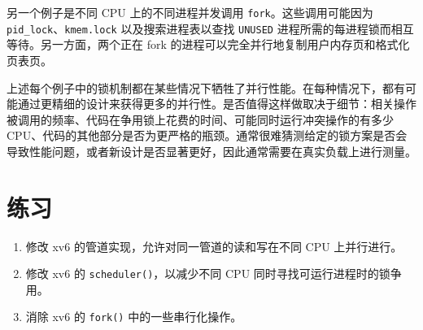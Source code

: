 另一个例子是不同 CPU 上的不同进程并发调用 {\tt fork}。这些调用可能因为 {\tt pid\_lock}、{\tt kmem.lock} 以及搜索进程表以查找 {\tt UNUSED} 进程所需的每进程锁而相互等待。另一方面，两个正在 fork 的进程可以完全并行地复制用户内存页和格式化页表页。

上述每个例子中的锁机制都在某些情况下牺牲了并行性能。在每种情况下，都有可能通过更精细的设计来获得更多的并行性。是否值得这样做取决于细节：相关操作被调用的频率、代码在争用锁上花费的时间、可能同时运行冲突操作的有多少 CPU、代码的其他部分是否为更严格的瓶颈。通常很难猜测给定的锁方案是否会导致性能问题，或者新设计是否显著更好，因此通常需要在真实负载上进行测量。

\section{练习}

\begin{enumerate}

\item 修改 xv6 的管道实现，允许对同一管道的读和写在不同 CPU 上并行进行。

\item 修改 xv6 的 \texttt{scheduler()}，以减少不同 CPU 同时寻找可运行进程时的锁争用。

\item 消除 xv6 的 \texttt{fork()} 中的一些串行化操作。

\end{enumerate}
